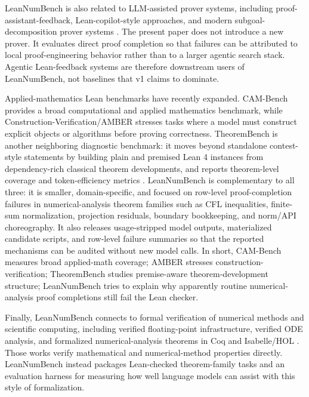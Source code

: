 \documentclass{article}
\begin{document}
LeanNumBench is also related to LLM-assisted prover systems, including
proof-assistant-feedback, Lean-copilot-style approaches, and modern
subgoal-decomposition prover systems
\citep{xin2024deepseekprover,ren2025deepseekproverv2,song2024leancopilot}.
The present paper does not introduce a new prover. It evaluates direct proof
completion so that failures can be attributed to local proof-engineering
behavior rather than to a larger agentic search stack. Agentic Lean-feedback
systems are therefore downstream users of LeanNumBench, not baselines that v1
claims to dominate.

Applied-mathematics Lean benchmarks have recently expanded. CAM-Bench
\citep{long2026cambench} provides a broad computational and applied
mathematics benchmark, while Construction-Verification/AMBER
\citep{yang2026constructionverification} stresses tasks where a model must
construct explicit objects or algorithms before proving correctness.
TheoremBench is another neighboring diagnostic benchmark: it moves beyond
standalone contest-style statements by building plain and premised Lean 4
instances from dependency-rich classical theorem developments, and reports
theorem-level coverage and token-efficiency metrics
\citep{pham2026theorembench}. LeanNumBench is complementary to all three: it is
smaller, domain-specific, and focused on row-level proof-completion failures in
numerical-analysis theorem families such as CFL inequalities, finite-sum
normalization, projection residuals, boundary bookkeeping, and norm/API
choreography. It also releases usage-stripped model outputs, materialized
candidate scripts, and row-level failure summaries so that the reported
mechanisms can be audited without new model calls. In short, CAM-Bench measures
broad applied-math coverage; AMBER stresses construction-verification;
TheoremBench studies premise-aware theorem-development structure; LeanNumBench
tries to explain why apparently routine numerical-analysis proof completions
still fail the Lean checker.

Finally, LeanNumBench connects to formal verification of numerical methods and
scientific computing, including verified floating-point infrastructure,
verified ODE analysis, and formalized numerical-analysis theorems in Coq and
Isabelle/HOL
\citep{boldo2011flocq,immler2012ode,boldo2017laxmilgram,tekriwal2021lax}.
Those works verify mathematical and numerical-method properties directly.
LeanNumBench instead packages Lean-checked theorem-family tasks and an evaluation
harness for measuring how well language models can assist with this style of
formalization.
\end{document}
